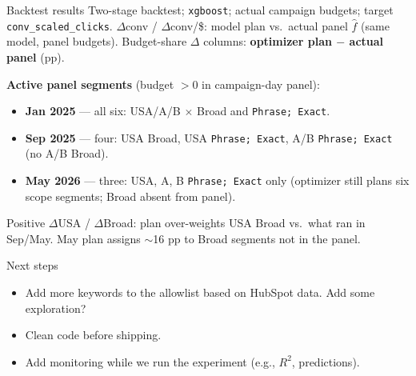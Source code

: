 \documentclass[11pt]{beamer}
\begin{document}
\begin{frame}{Backtest results}
  \scriptsize
  Two-stage backtest; \texttt{xgboost}; actual campaign budgets; target \texttt{conv\_scaled\_clicks}.
  $\Delta$conv / $\Delta$conv/\$: model plan vs.\ actual panel $\hat f$ (same model, panel budgets).
  Budget-share $\Delta$ columns: \textbf{optimizer plan $-$ actual panel} (pp).

  \vspace{0.25em}
  \centering
  \setlength{\tabcolsep}{3pt}
  \renewcommand{\arraystretch}{1.05}

  \vspace{0.35em}
  \raggedright
  \textbf{Active panel segments} (budget ${>}0$ in campaign-day panel):
  \begin{itemize}
    \item \textbf{Jan 2025} --- all six: USA/A/B $\times$ Broad and \texttt{Phrase; Exact}.
    \item \textbf{Sep 2025} --- four: USA Broad, USA \texttt{Phrase; Exact}, A/B \texttt{Phrase; Exact} (no A/B Broad).
    \item \textbf{May 2026} --- three: USA, A, B \texttt{Phrase; Exact} only (optimizer still plans six scope segments; Broad absent from panel).
  \end{itemize}

  \vspace{0.15em}
  {\scriptsize Positive $\Delta$USA / $\Delta$Broad: plan over-weights USA Broad vs.\ what ran in Sep/May. May plan assigns ${\sim}$16 pp to Broad segments not in the panel.}
  \normalsize
\end{frame}

\begin{frame}{Next steps}
  \begin{itemize}
    \item Add more keywords to the allowlist based on HubSpot data. Add some exploration?
    \item Clean code before shipping.
    \item Add monitoring while we run the experiment (e.g., $R^2$, predictions).
  \end{itemize}
\end{frame}
\end{document}
